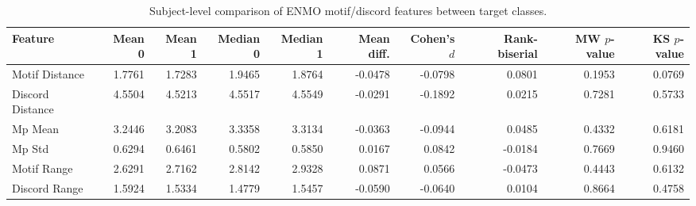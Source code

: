 \begin{table}
\caption{Subject-level comparison of ENMO motif/discord features between target classes.}
\label{tab:subject-level-motif-discord-comparison}
\begin{tabular}{lrrrrrrrrr}
\toprule
Feature & Mean 0 & Mean 1 & Median 0 & Median 1 & Mean diff. & Cohen's $d$ & Rank-biserial & MW $p$-value & KS $p$-value \\
\midrule
Motif Distance & 1.7761 & 1.7283 & 1.9465 & 1.8764 & -0.0478 & -0.0798 & 0.0801 & 0.1953 & 0.0769 \\
Discord Distance & 4.5504 & 4.5213 & 4.5517 & 4.5549 & -0.0291 & -0.1892 & 0.0215 & 0.7281 & 0.5733 \\
Mp Mean & 3.2446 & 3.2083 & 3.3358 & 3.3134 & -0.0363 & -0.0944 & 0.0485 & 0.4332 & 0.6181 \\
Mp Std & 0.6294 & 0.6461 & 0.5802 & 0.5850 & 0.0167 & 0.0842 & -0.0184 & 0.7669 & 0.9460 \\
Motif Range & 2.6291 & 2.7162 & 2.8142 & 2.9328 & 0.0871 & 0.0566 & -0.0473 & 0.4443 & 0.6132 \\
Discord Range & 1.5924 & 1.5334 & 1.4779 & 1.5457 & -0.0590 & -0.0640 & 0.0104 & 0.8664 & 0.4758 \\
\bottomrule
\end{tabular}
\end{table}
